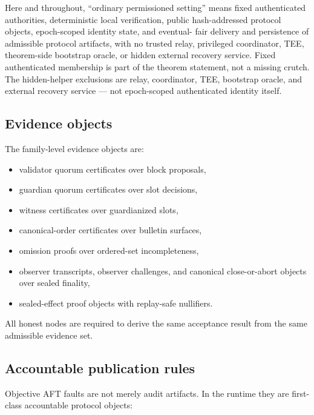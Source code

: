 \documentclass[11pt]{article}
\begin{document}
Here and throughout, ``ordinary permissioned setting'' means fixed
authenticated authorities, deterministic local verification, public
hash-addressed protocol objects, epoch-scoped identity state, and eventual-
fair delivery and persistence of admissible protocol artifacts, with no
trusted relay, privileged coordinator, TEE, theorem-side bootstrap oracle, or
hidden external recovery service.
Fixed authenticated membership is part of the theorem statement, not a missing
crutch. The hidden-helper exclusions are relay, coordinator, TEE, bootstrap
oracle, and external recovery service --- not epoch-scoped authenticated
identity itself.

\subsection{Evidence objects}

The family-level evidence objects are:

\begin{itemize}[leftmargin=1.5em]
\item validator quorum certificates over block proposals,
\item guardian quorum certificates over slot decisions,
\item witness certificates over guardianized slots,
\item canonical-order certificates over bulletin surfaces,
\item omission proofs over ordered-set incompleteness,
\item observer transcripts, observer challenges, and canonical close-or-abort
objects over sealed finality,
\item sealed-effect proof objects with replay-safe nullifiers.
\end{itemize}

All honest nodes are required to derive the same acceptance result from the
same admissible evidence set.

\subsection{Accountable publication rules}

Objective AFT faults are not merely audit artifacts. In the runtime they
are first-class accountable protocol objects:
\end{document}
